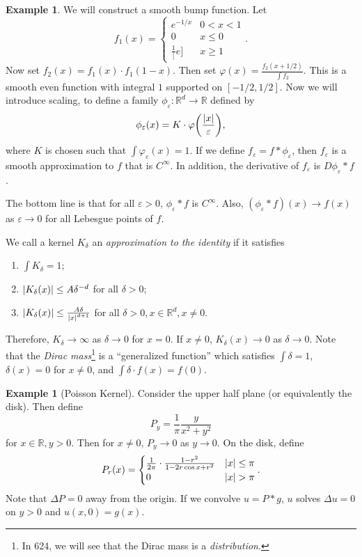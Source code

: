 \documentclass[leqno, openany]{memoir}
\theoremstyle{definition}
\newtheorem{exm}[thm]{Example}
\theoremstyle{remark}
\theoremstyle{plain}
\theoremstyle{definition}
\theoremstyle{remark}
\newcommand{\R}{\mathbb{R}}
\newcommand{\ep}{\varepsilon}
\begin{document}
\begin{exm} We will construct a smooth bump function. Let \[ f_1(x) =
    \begin{cases} e^{-1/x} & 0 < x < 1 \\ 0 & x \leq 0 \\ \frac{1}[e] & x \geq
    1 \end{cases}. \] Now set $f_2(x) = f_1(x) \cdot f_1(1-x)$. Then set
    $\varphi(x) = \frac{f_2(x+1/2)}{\int f_2}$. This is a smooth even function
    with integral $1$ supported on $[-1/2, 1/2]$. Now we will introduce
    scaling, to define a family $\phi_{\ep}: \R^d \to \R$ defined by \[
    \phi_{\ep}(x) = K \cdot \varphi\qty(\frac{\abs{x}}{\ep}), \] where $K$ is
    chosen such that $\int \varphi_{\ep}(x) = 1$. If we define $f_{\ep} =
    f*\phi_{\ep}$, then $f_{\ep}$ is a smooth approximation to $f$ that is
    $C^{\infty}$. In addition, the derivative of $f_{\ep}$ is $D \phi_{\ep} *
    f$.

    The bottom line is that for all $\ep > 0$, $\phi_{\ep} * f$ is
$C^{\infty}$. Also, $(\phi_{\ep} * f)(x) \to f(x)$ as $\ep \to 0$ for all
Lebesgue points of $f$.  \end{exm}

We call a kernel $K_{\delta}$ an \textit{approximation to the identity} if it
satisfies \begin{enumerate} \item $\int K_{\delta} = 1$; \item
    $\abs{K_{\delta}(x)} \leq A \delta^{-d}$ for all $\delta > 0$; \item
    $\abs{K_{\delta}(x)} \leq \frac{A \delta}{\abs{x}^{d+1}}$ for all $\delta >
    0, x \in \R^d, x \neq 0$.  \end{enumerate} Therefore, $K_{\delta} \to
    \infty$ as $\delta \to 0$ for $x = 0$. If $x \neq 0$, $K_{\delta}(x) \to 0$
    as $\delta \to 0$. Note that the \textit{Dirac mass}\footnote{In 624, we
    will see that the Dirac mass is a \textit{distribution}.} is a
    ``generalized function'' which satisfies $\int \delta = 1$, $\delta(x) = 0$
    for $x \neq 0$, and $\int \delta \cdot f(x) = f(0)$.

\begin{exm}[Poisson Kernel] Consider the upper half plane (or equivalently the
    disk). Then define \[ P_y = \frac{1}{\pi} \frac{y}{x^2 + y^2} \] for $x \in
    \R, y > 0$. Then for $x \neq 0$, $P_y \to 0$ as $y \to 0$. On the disk,
    define \[ P_r(x) = \begin{cases} \frac{1}{2 \pi} \cdot \frac{1-r^2}{1 - 2r
    \cos x + r^2} & \abs{x} \leq \pi \\ 0 & \abs{x} > \pi \end{cases}. \] Note
    that $\Delta P = 0$ away from the origin. If we convolve $u = P * g$, $u$
    solves $\Delta u = 0$ on $y > 0$ and $u(x,0) = g(x)$.  \end{exm}
\end{document}
